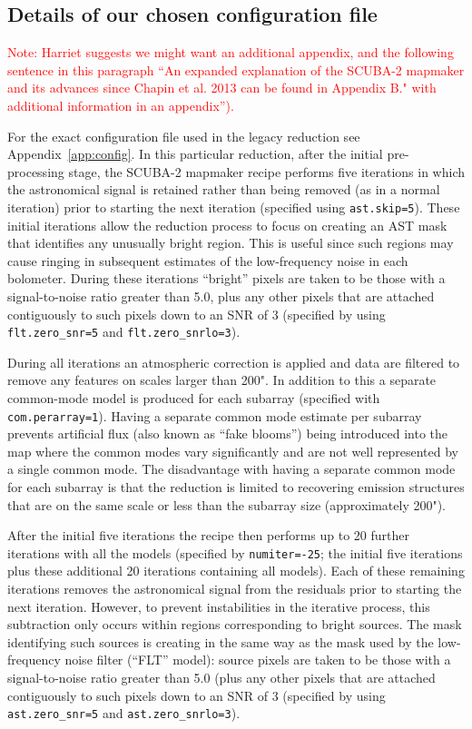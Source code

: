 \documentclass[twocolumn,times]{aastex6}
\newcommand{\note}[1]{\textcolor{red}{Note: #1}}
\begin{document}
\subsection{Details of our chosen configuration file}

\note{Harriet suggests we might want an additional appendix, and the
  following sentence in this paragraph ``An expanded explanation of
  the SCUBA-2 mapmaker and its advances since Chapin et al. 2013 can
  be found in Appendix B." with additional information in an
  appendix'').}



For the exact configuration file used in the legacy reduction see
Appendix~\ref{app:config}. In this particular reduction, after the initial
pre-processing stage, the SCUBA-2 mapmaker recipe performs five
iterations in which the astronomical signal is retained rather than
being removed (as in a normal iteration) prior to starting the next
iteration (specified using \texttt{ast.skip=5}). These initial
iterations allow the reduction process to focus on creating an AST mask
that identifies any unusually bright region. This is useful since such
regions may cause ringing in subsequent estimates of the low-frequency
noise in each bolometer. During these iterations ``bright'' pixels are
taken to be those with a signal-to-noise ratio greater than 5.0, plus
any other pixels that are attached contiguously to such pixels down
to an SNR of 3 (specified by using \texttt{flt.zero\_snr=5} and
\texttt{flt.zero\_snrlo=3}).

During all iterations an atmospheric correction is applied and data
are filtered to remove any features on scales larger than 200". In
addition to this a separate common-mode model is produced for each
subarray (specified with \texttt{com.perarray=1}). Having a separate
common mode estimate per subarray prevents artificial flux (also
known as ``fake blooms'') being introduced into the map where the
common modes vary significantly and are not well represented by a
single common mode. The disadvantage with having a separate common
mode for each subarray is that the reduction is limited to recovering
emission structures that are on the same scale or less than the
subarray size (approximately 200").

After the initial five iterations the recipe then performs up to 20
further iterations with all the models (specified by
\texttt{numiter=-25}; the initial five iterations plus these additional 20
iterations containing all models). Each of these remaining iterations
removes the astronomical signal from the residuals prior to starting
the next iteration. However, to prevent instabilities in the iterative
process, this subtraction only occurs within regions corresponding to
bright sources.  The mask identifying such sources is creating in the
same way as the mask used by the low-frequency noise filter (``FLT''
model): source pixels are taken to be those with a signal-to-noise
ratio greater than 5.0 (plus any other pixels that are attached
contiguously to such pixels down to an SNR of 3 (specified by using
\texttt{ast.zero\_snr=5} and \texttt{ast.zero\_snrlo=3}).
\end{document}
